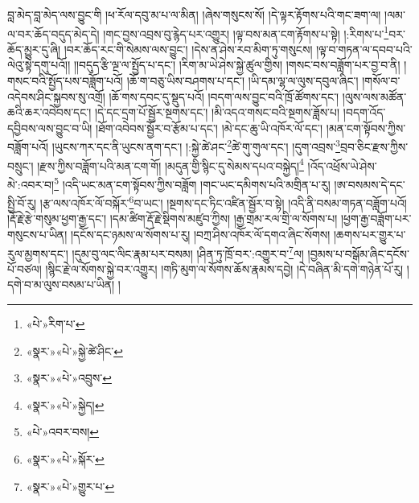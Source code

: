 བླ་མེད་བླ་མེད་ལས་བྱུང་གི །ཕ་རོལ་དབུ་མ་པ་ལ་མིན། །ཞེས་གསུངས་སོ། །དེ་ལྟར་རྟོགས་པའི་གང་ཟག་ལ། །ལམ་ལ་བར་ཆོད་བདུད་མེད་དེ། །གང་བྱས་འབྲས་བུ་རྙེད་པར་འགྱུར། །ལྟ་བས་མན་ངག་རྟོགས་པ་སྟེ། །:རིགས་པ་\footnote{«པེ་»རིག་པ་}བར་ཆོད་མྱུར་དུ་ཞི། །བར་ཆོད་རང་གི་སེམས་ལས་བྱུང་། །དེས་ན་ཤེས་རབ་མིག་ཏུ་གསུངས། །ལྟ་བ་གཏན་ལ་དབབ་པའི་ལེའུ་སྟེ་དགུ་པའོ།། །།བདུད་རྩི་ལྔ་ལ་སྤྱོད་པ་དང་། །རིག་མ་ཡེ་ཤེས་སྐྱེ་ཚུལ་གྱིས། །གསང་བས་བཟློག་པར་བྱ་བ་ནི། །གསང་བའི་སྤྱོད་པས་བཟློག་པའོ། །ཆོ་ག་བཅུ་ཡིས་བཤགས་པ་དང་། །ཡི་དམ་ལྷ་ལ་ལུས་དབུལ་ཞིང་། །གསོལ་བ་འདེབས་ཤིང་སྐྱབས་སུ་འགྲོ། །ཆོ་གས་དབང་དུ་སྡུད་པའོ། །བདག་ལས་བྱུང་བའི་ཁྲོ་ཚོགས་དང་། །ལུས་ལས་མཚོན་ཆའི་ཆར་འབེབས་དང་། །དེ་དང་དྲག་པོ་སྦྱོར་སྔགས་དང་། །མི་འདའ་གསང་བའི་སྔགས་ཟློས་པ། །བདག་འོད་དབྱིབས་ལས་བྱུང་བ་ཡི། །ཐོག་འབེབས་སྦྱོར་བ་རྩོམ་པ་དང་། །མེ་དང་ཆུ་ཡི་འཁོར་ལོ་དང་། །མན་ངག་སྟོབས་ཀྱིས་བཟློག་པའོ། །ཡུངས་ཀར་དང་ནི་ཡུངས་ནག་དང་། །:སྐྱེ་ཚེ་ཤང་\footnote{«སྣར་»«པེ་»སྐྱེ་ཚེ་ཤིང་}ཚེ་གུ་གུལ་དང་། །དུག་འབྲས་\footnote{«སྣར་»«པེ་»འབྲུས་}བྲབ་ཅིང་རྫས་ཀྱིས་བསྲུང་། །རྫས་ཀྱིས་བཟློག་པའི་མན་ངག་གོ། །མདུན་གྱི་སྙིང་དུ་སེམས་དཔའ་བསྐྱེད།\footnote{«སྣར་»«པེ་»སྐྱེད།} །འོད་འཕྲོས་ཡེ་ཤེས་མེ་:འབར་བ།\footnote{«པེ་»འབར་བས།} །འདི་ཡང་མན་ངག་སྟོབས་ཀྱིས་བཟློག །གང་ཡང་དམིགས་པའི་མགྲིན་པ་རུ། །ཨ་བསམས་དེ་དང་སྤྱི་བོ་རུ། །རྩ་ལས་འཁོར་ལོ་བསྐོར་\footnote{«སྣར་»«པེ་»སྐོར་}བ་ཡང་། །སྔགས་དང་ཏིང་འཛིན་སྦྱོར་བ་སྟེ། །འདི་ནི་བསམ་གཏན་བཟློག་པའོ། །རྡོ་རྗེ་རྩེ་གསུམ་ཕྱག་རྒྱ་དང་། །དམ་ཚིག་རྡོ་རྗེ་སྡིགས་མཛུབ་ཀྱིས། །རྒྱ་གྲམ་རལ་གྲི་ལ་སོགས་པ། །ཕྱག་རྒྱ་བཟློག་པར་གསུངས་པ་ཡིན། །དངོས་དང་ཉམས་ལ་སོགས་པ་རུ། །བཀྲ་ཤིས་འཁོར་ལོ་དགའ་ཞིང་སོགས། །ཆགས་པར་གྱུར་པ་རུལ་མྱགས་དང་། །དུམ་བུ་ལང་ལིང་རྣམ་པར་བསམ། །ཤིན་ཏུ་ཁྲོ་བར་:འགྱུར་བ་\footnote{«སྣར་»«པེ་»གྱུར་པ་}ལ། །བྱམས་པ་བསྒོམ་ཞིང་དངོས་པོ་བཙལ། །སྙིང་རྗེ་ལ་སོགས་སྐྱེ་བར་འགྱུར། །གཏི་མུག་ལ་སོགས་ཆོས་རྣམས་དབྱེ། །དེ་བཞིན་མི་དགེ་གཉེན་པོ་རུ། །དགེ་བ་མ་ལུས་བསམ་པ་ཡིན། །
